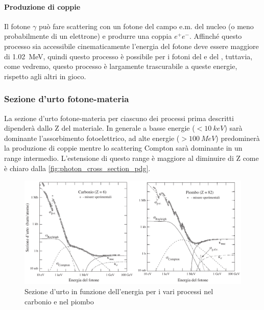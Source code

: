  \paragraph{Produzione di coppie}
 Il fotone $\gamma$ può fare scattering con un fotone del campo e.m. del nucleo (o meno probabilmente di un elettrone) e produrre una coppia $e^+e^-$. Affinché questo processo sia accessibile cinematicamente l'energia del fotone deve essere maggiore di \SI{1.02}{MeV}, quindi questo processo è possibile per i fotoni del \co\;  e del \na, tuttavia, come vedremo, questo processo è largamente trascurabile a queste energie, rispetto agli altri in gioco.
 
 
 \subsubsection{Sezione d'urto fotone-materia} \label{efficiency}
 La sezione d'urto fotone-materia per ciascuno dei processi prima descritti dipenderà dallo Z del materiale. In generale a basse energie ($ < \SI{10}{keV}$) sarà dominante l'assorbimento fotoelettrico, ad alte energie ($>\SI{100}{MeV}$) predominerà la produzione di coppie mentre lo scattering Compton sarà dominante in un range intermedio. L'estensione di questo range è maggiore al diminuire di Z come è chiaro dalla \autoref{fig:photon_cross_section_pdg}.
 
  \begin{figure}[h]
 	\centering
 	\includegraphics[width=\textwidth]{photon-matter-interaction}
 	\caption{\label{fig:photon_cross_section_pdg}Sezione d'urto in funzione dell'energia per i vari processi nel carbonio e nel piombo \cite{4}}
 \end{figure}

